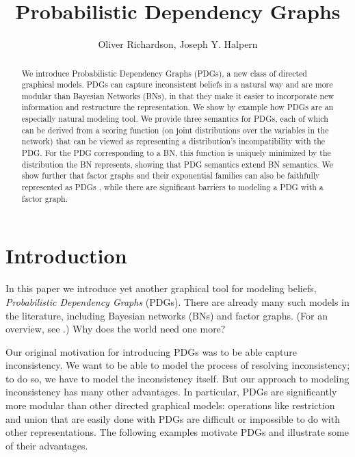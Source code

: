 \documentclass[letterpaper]{article} %
\title{Probabilistic Dependency Graphs}
\author{
Oliver Richardson, Joseph Y. Halpern \\
}
\theoremstyle{plain}
\theoremstyle{definition}
\theoremstyle{remark}
\newif\ifbody\bodytrue
\begin{document}
\ifbody
\maketitle
\begin{abstract}
We introduce Probabilistic Dependency Graphs (PDGs), a new class of
directed graphical models.   PDGs can capture inconsistent beliefs in a
natural way and are more modular than Bayesian Networks (BNs), in that
they make it easier to incorporate new information and restructure the  
representation.    We show by example how PDGs are an especially natural
modeling tool.
We provide three semantics for PDGs, each of which can be derived from a
scoring function (on joint distributions over the
variables in the network) that can be viewed as representing a
distribution's incompatibility with the PDG.
For the PDG corresponding
to a BN, this function is uniquely minimized by the distribution the
BN represents, showing that PDG semantics extend BN semantics.  
We show further that factor graphs
and their exponential families
can also be faithfully represented as PDGs%
, while there are significant barriers to modeling a PDG with a factor graph.
\end{abstract}

\section{Introduction}

In this paper we introduce yet another graphical
tool
for modeling beliefs,
\emph{Probabilistic Dependency Graphs} (PDGs). There are already many
such models in the literature, including Bayesian networks (BNs) and
factor graphs. (For an overview, see 
\cite{KF09}.)
Why does the world need one more?  

Our original motivation for introducing PDGs was to be able capture
inconsistency. We want to be able to model the process of resolving
inconsistency; to do so, we have to model the inconsistency itself. But our
approach to modeling inconsistency has many other advantages. In particular,
PDGs are significantly more modular than other directed graphical models:
operations like restriction and union that are easily done with PDGs are
difficult or impossible to do with other representations.
The following examples motivate PDGs and illustrate some of
their advantages.
\end{document}
